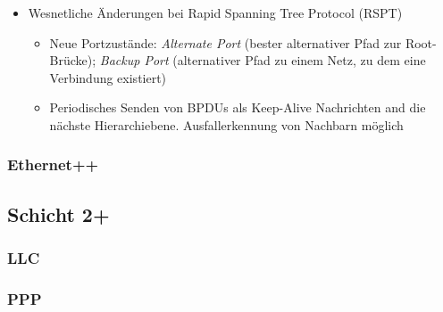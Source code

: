 \begin{itemize}
\begin{itemize}
\begin{itemize}
			\item Wesnetliche Änderungen bei Rapid Spanning Tree Protocol (RSPT)
			\begin{itemize}
				\item Neue Portzustände: \textit{Alternate Port} (bester alternativer Pfad zur Root-Brücke); \textit{Backup Port} (alternativer Pfad zu einem Netz, zu dem eine Verbindung existiert)
				\item Periodisches Senden von BPDUs als Keep-Alive Nachrichten and die nächste Hierarchiebene. Ausfallerkennung von Nachbarn möglich
			\end{itemize}
		\end{itemize}
	\end{itemize}
\end{itemize}

\subsubsection{Ethernet++}


\subsection{Schicht 2+}

\subsubsection{LLC}

\subsubsection{PPP}